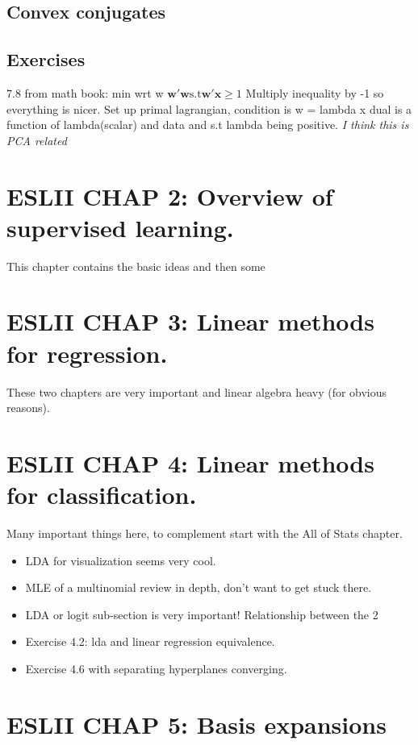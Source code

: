 \documentclass{article}
\begin{document}
\subsection*{Convex conjugates}

\subsection*{Exercises}
7.8 from math book: min wrt w $\mathbf{w'w} \text{s.t} \mathbf{w'x}\geq 1$
Multiply inequality by -1 so everything is nicer. Set up primal lagrangian, condition is w = lambda x 
dual is a function of lambda(scalar) and data and s.t lambda being positive. 
\textit{I think this is PCA related} 

\section*{ESLII CHAP 2: Overview of supervised learning.}
This chapter contains the basic ideas and then some 

\section*{ESLII CHAP 3: Linear methods for regression.}
These two chapters are very important and linear algebra heavy (for obvious reasons).
\section*{ESLII CHAP 4: Linear methods for classification.}
Many important things here, to complement start with the All of Stats chapter. 

\begin{itemize}
    \item LDA for visualization seems very cool.
    \item MLE of a multinomial review in depth, don't want to get stuck there.
    \item LDA or logit sub-section is very important! Relationship between the 2
    \item Exercise 4.2: lda and linear regression equivalence.
    \item Exercise 4.6 with separating hyperplanes converging.
\end{itemize}


\section*{ESLII CHAP 5: Basis expansions}
\end{document}

